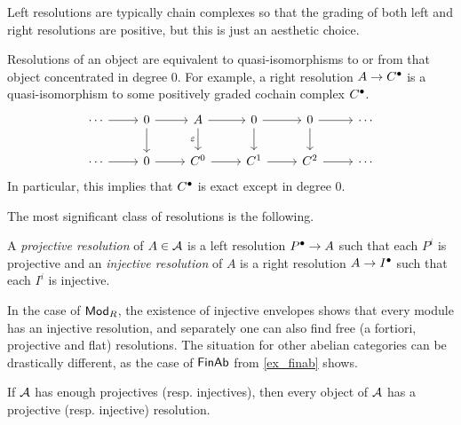 \begin{remark}
  \label{rem_left_res_as_chain_complex}
  Left resolutions are typically chain complexes so that the grading
  of both left and right resolutions are positive, but this is just
  an aesthetic choice.
\end{remark}

\begin{remark}
  \label{rem_res_is_a_qis}
  Resolutions of an object are equivalent to quasi-isomorphisms to or
  from that object concentrated in degree 0.
  For example, a right resolution $A \to {{C}}^{\bullet}$ is a
  quasi-isomorphism to some positively graded cochain complex ${{C}}^{\bullet}$.
  \[
    \begin{tikzcd}
      \cdots & 0 & A & 0 & 0 & \cdots \\
      \cdots & 0 & {C^0} & {C^1} & {C^2} & \cdots
      \arrow[from=1-1, to=1-2]
      \arrow[from=1-2, to=1-3]
      \arrow[from=1-2, to=2-2]
      \arrow[from=1-3, to=1-4]
      \arrow["\varepsilon"', from=1-3, to=2-3]
      \arrow[from=1-4, to=1-5]
      \arrow[from=1-4, to=2-4]
      \arrow[from=1-5, to=1-6]
      \arrow[from=1-5, to=2-5]
      \arrow[from=2-1, to=2-2]
      \arrow[from=2-2, to=2-3]
      \arrow[from=2-3, to=2-4]
      \arrow[from=2-4, to=2-5]
      \arrow[from=2-5, to=2-6]
    \end{tikzcd}
  \]
  In particular, this implies that ${{C}}^{\bullet}$ is exact except
  in degree 0.
\end{remark}


The most significant class of resolutions is the following.

\begin{definition}
  A \emph{projective resolution} of $A \in \mathcal{A}$ is a left
  resolution ${{P}}^{\bullet} \to A$ such that each $P^i$ is
  projective and an \emph{injective resolution} of $A$ is a right
  resolution $A \to {{I}}^{\bullet}$ such that each $I^i$ is injective.
\end{definition}

In the case of ${\mathsf{Mod}}_{{R}}$, the existence of injective envelopes shows
that every module has an injective resolution, and separately one can
also find free (a fortiori, projective and flat) resolutions.
The situation for other abelian categories can be drastically
different, as the case of $\mathsf{FinAb}$ from \cref{ex_finab} shows.

\begin{proposition}
  If $\mathcal{A}$ has enough projectives (resp. injectives), then
  every object of $\mathcal{A}$ has a projective (resp. injective) resolution.
\end{proposition}

